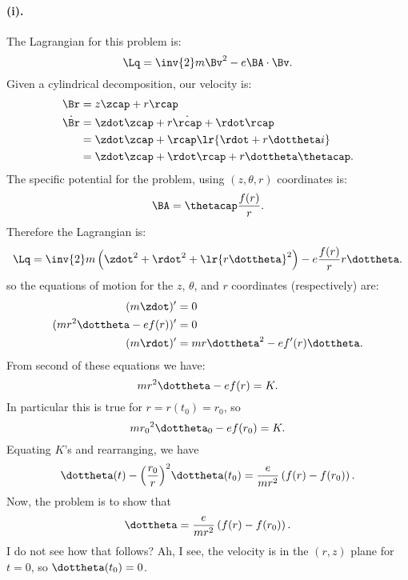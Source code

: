 {\paragraph{(i).}
%
The Lagrangian for this problem is:
%
\begin{equation}\label{eqn:tongMf1:1860}
\Lq = \inv{2} m \Bv^2 - e \BA \cdot \Bv.
\end{equation}
%
Given a cylindrical decomposition, our velocity is:
%
\begin{equation}\label{eqn:tongMf1:780}
\begin{aligned}
\Br &= z \zcap + r \rcap \\
\dot{\Br}
&= \zdot \zcap + r\dot{\rcap} + \rdot \rcap \\
&= \zdot \zcap + \rcap
\lr{ \rdot + r\dottheta i } \\
&= \zdot \zcap + \rdot \rcap + r\dottheta \thetacap.
\end{aligned}
\end{equation}
%
The specific potential for the problem, using \((z,\theta,r)\) coordinates is:
%
\begin{equation}\label{eqn:tongMf1:1880}
\BA = \thetacap \frac{f(r)}{r}.
\end{equation}
%
Therefore the Lagrangian is:
\begin{equation}\label{eqn:tongMf1:1900}
\Lq = \inv{2} m \left(\zdot^2 + \rdot^2 +
\lr{ r\dottheta }^2
\right) - e \frac{f(r)}{r} r \dottheta.
\end{equation}
%
so the equations of motion for the \(z\), \(\theta\), and \(r\) coordinates (respectively) are:
%
\begin{equation}\label{eqn:tongMf1:800}
\begin{aligned}
(m\zdot)' &= 0 \\
(m r^2 \dottheta -e f(r))' &= 0 \\
(m \rdot)' &= m r \dottheta^2 - e f'(r) \dottheta .
\end{aligned}
\end{equation}
%
From second of these equations we have:
%
\begin{equation}\label{eqn:tongMf1:1920}
m r^2 \dottheta - e f(r) = K.
\end{equation}
%
In particular this is true for \(r = r(t_0) = r_0\), so
%
\begin{equation}\label{eqn:tongMf1:1940}
m {r_0}^2 \dottheta_0 - e f(r_0) = K.
\end{equation}
%
Equating \( K \)'s and rearranging, we have
\begin{equation}\label{eqn:tongMf1:1960}
\dottheta(t) - {\left(\frac{r_0}{r}\right)}^2 \dottheta(t_0) = \frac{e}{m r^2} \left( f(r) - f(r_0) \right).
\end{equation}
%
Now, the problem is to show that
\begin{equation}\label{eqn:tongMf1:1980}
\dottheta = \frac{e}{mr^2} \left(f(r) - f(r_0)\right).
\end{equation}
%
I do not see how that follows?  Ah, I see, the velocity is in the \((r,z)\) plane for \(t=0\), so \(\dottheta(t_0) = 0\).
%
}
